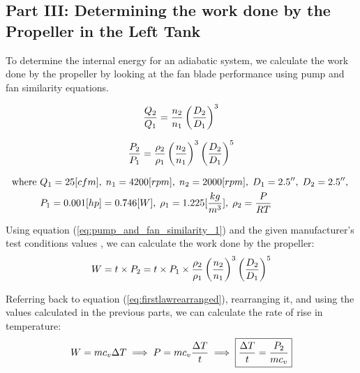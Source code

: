 \documentclass[12pt]{article}
\begin{document}
\subsection*{Part III:  Determining the work done by the Propeller in the Left Tank}

To determine the internal energy for an adiabatic system, we calculate the work done by the propeller by looking at the fan blade performance using pump and fan similarity equations.

\begin{equation}
    \frac{{Q}_{\rm 2}}{{Q}_{\rm 1}}=\frac{{n}_{\rm 2}}{{n}_{\rm 1}}\left(\frac{{D}_{\rm 2}}{{D}_{\rm 1}}\right)^3
    \label{eq:pump_and_fan_similarity_1}
\end{equation}

\begin{equation}
    \frac{{P}_{\rm 2}}{{P}_{\rm 1}}=\frac{{\rho}_{\rm 2}}{{\rho}_{\rm 1}}\left(\frac{{n}_{\rm 2}}{{n}_{\rm 1}}\right)^3\left(\frac{{D}_{\rm 2}}{{D}_{\rm 1}}\right)^5
    \label{eq:pump_and_fan_similarity_2}
\end{equation}

\begin{align*}
    \text{where }
    &Q_{\rm 1} = 25[cfm],\;n_{\rm 1} = 4200[rpm],\;n_{\rm 2} = 2000[rpm],\;D_{\rm 1} = 2.5'',\;D_{\rm 2} = 2.5'',\;\\
    &P_{\rm 1} = 0.001[hp] = 0.746[W],\;{\rho}_{1}=1.225[\frac{kg}{m^3}],\;{\rho}_{2}=\frac{P}{RT}
\end{align*}

Using equation (\ref{eq:pump_and_fan_similarity_1}) and the given manufacturer’s test conditions values \autocite{che}, we can calculate the work done by the propeller:
\begin{equation}
    W=t \times {P}_{\rm 2} =t \times {P}_{\rm 1} \times \frac{{\rho}_{\rm 2}}{{\rho}_{\rm 1}}\left(\frac{{n}_{\rm 2}}{{n}_{\rm 1}}\right)^3\left(\frac{{D}_{\rm 2}}{{D}_{\rm 1}}\right)^5
    \label{eq:work done by the propeller}
\end{equation}

Referring back to equation (\ref{eq:firstlawrearranged}), rearranging it, and using the values calculated in the previous parts, we can calculate the rate of rise in temperature:
\begin{equation}
    W=m c_v\Delta T\implies P=m c_v\frac{\Delta T}{t}\implies\boxed{\frac{\Delta T}{t}=\frac{{P}_{\rm 2}}{m c_v}}
    \label{eq:rate_of_rise_in_temp}
\end{equation}
\end{document}
